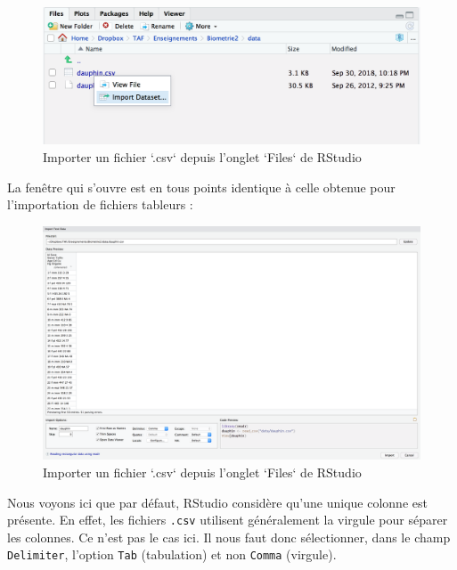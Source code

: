 \documentclass[a4paperpaper,]{article}
\theoremstyle{definition}
\theoremstyle{definition}
\theoremstyle{definition}
\theoremstyle{remark}
\begin{document}
\begin{figure}[htpb]

{\centering \includegraphics[width=0.8\linewidth]{images/importcsv1} 

}

\caption{Importer un fichier `.csv` depuis l'onglet `Files` de RStudio}\label{fig:importcsv1}
\end{figure}

La fenêtre qui s'ouvre est en tous points identique à celle obtenue pour
l'importation de fichiers tableurs :

\begin{figure}[htpb]

{\centering \includegraphics[width=1\linewidth]{images/importcsv2} 

}

\caption{Importer un fichier `.csv` depuis l'onglet `Files` de RStudio}\label{fig:importcsv2}
\end{figure}

Nous voyons ici que par défaut, RStudio considère qu'une unique colonne
est présente. En effet, les fichiers \texttt{.csv} utilisent
généralement la virgule pour séparer les colonnes. Ce n'est pas le cas
ici. Il nous faut donc sélectionner, dans le champ \texttt{Delimiter},
l'option \texttt{Tab} (tabulation) et non \texttt{Comma} (virgule).
\end{document}
